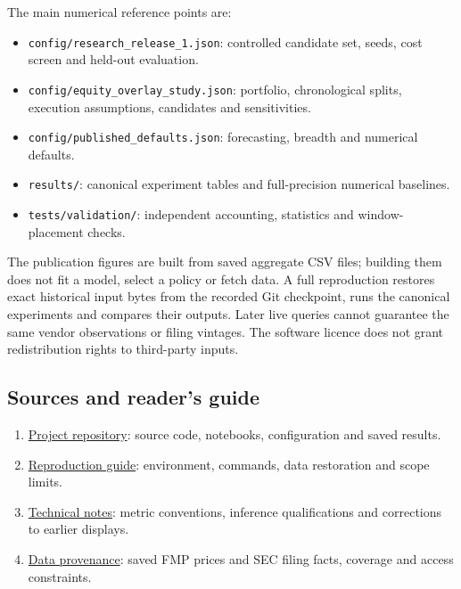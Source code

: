 \documentclass[11pt,a4paper]{article}
\begin{document}
The main numerical reference points are:
\begin{itemize}
\item \texttt{config/research\_release\_1.json}: controlled candidate set, seeds, cost screen and held-out evaluation.
\item \texttt{config/equity\_overlay\_study.json}: portfolio, chronological splits, execution assumptions, candidates and sensitivities.
\item \texttt{config/published\_defaults.json}: forecasting, breadth and numerical defaults.
\item \texttt{results/}: canonical experiment tables and full-precision numerical baselines.
\item \texttt{tests/validation/}: independent accounting, statistics and window-placement checks.
\end{itemize}

The publication figures are built from saved aggregate CSV files; building them does not fit a model, select a policy or fetch data. A full reproduction restores exact historical input bytes from the recorded Git checkpoint, runs the canonical experiments and compares their outputs. Later live queries cannot guarantee the same vendor observations or filing vintages. The software licence does not grant redistribution rights to third-party inputs.

\subsection*{Sources and reader's guide}
\begin{enumerate}
\item \href{https://github.com/sai-reddivari/monte-carlo-portfolio-hedging}{Project repository}: source code, notebooks, configuration and saved results.
\item \href{https://github.com/sai-reddivari/monte-carlo-portfolio-hedging/blob/main/docs/REPRODUCTION.md}{Reproduction guide}: environment, commands, data restoration and scope limits.
\item \href{https://github.com/sai-reddivari/monte-carlo-portfolio-hedging/blob/main/docs/technical_notes.md}{Technical notes}: metric conventions, inference qualifications and corrections to earlier displays.
\item \href{https://github.com/sai-reddivari/monte-carlo-portfolio-hedging/blob/main/data/README.md}{Data provenance}: saved FMP prices and SEC filing facts, coverage and access constraints.
\end{enumerate}
\end{document}
